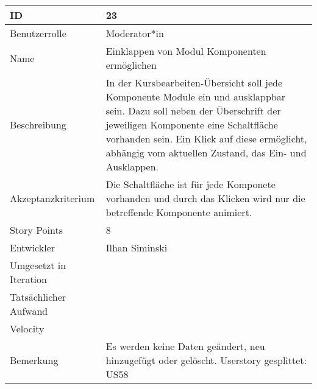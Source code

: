 \begin{tabularx}{\textwidth}{|p{}|X|}
	\hline
	ID & 23\\
	\hline
	Benutzerrolle & Moderator*in\\
	\hline
	Name & Einklappen von Modul Komponenten ermöglichen\\
	\hline
	Beschreibung & In der Kursbearbeiten-Übersicht soll jede Komponente Module ein und ausklappbar sein.
		Dazu soll neben der Überschrift der jeweiligen Komponente eine Schaltfläche vorhanden sein.
		Ein Klick auf diese ermöglicht, abhängig vom aktuellen Zustand, das Ein- und Ausklappen. \\
	\hline
	Akzeptanzkriterium & Die Schaltfläche ist für jede Komponete vorhanden und durch das Klicken wird nur die betreffende Komponente animiert.\\
	\hline
	Story Points & 8 \\
	\hline
	Entwickler & Ilhan Siminski\\
	\hline
	Umgesetzt in Iteration & \\
	\hline
	Tatsächlicher Aufwand & \\
	\hline
	Velocity & \\
	\hline
	Bemerkung & Es werden keine Daten geändert, neu hinzugefügt oder gelöscht. Userstory gesplittet: US58\\
	\hline
\end{tabularx}
\vspace{20pt}
